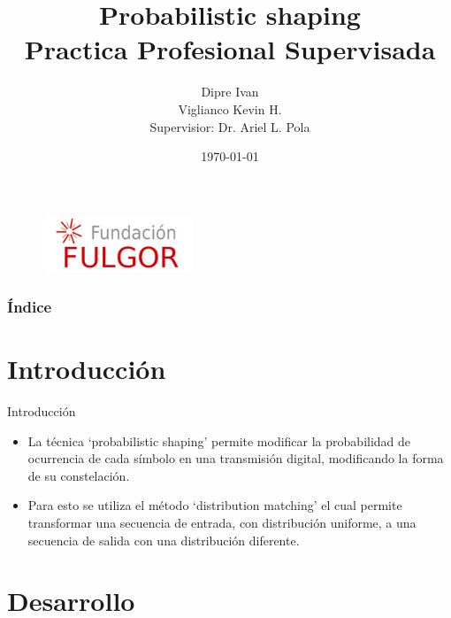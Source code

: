\documentclass[xcolor=table]{beamer}
\title{Probabilistic shaping\\ \small Practica Profesional Supervisada} %
\author{\small Dipre Ivan\\ \small Viglianco Kevin H.\\ \vspace{0.2cm} \small Supervisior: Dr. Ariel L. Pola} %
\date{\today} %
\begin{document}
\begin{frame}
\titlepage %
\begin{figure}[H]
\centering
\includegraphics[width=45mm]{fulgor_logo1.png}
\end{figure}

\end{frame}

\begin{frame}
\frametitle{\'Indice} 
\tableofcontents 
\end{frame}

\section{Introducci\'on}
\begin{frame}{Introducción}
    \begin{itemize}
        \item La técnica `probabilistic shaping' permite modificar la probabilidad de ocurrencia de cada símbolo en una transmisión digital, modificando la forma de su constelación.

        \item Para esto se utiliza el método `distribution matching' el cual permite transformar una secuencia de entrada, con distribución uniforme, a una secuencia de salida con una distribución diferente. 
    \end{itemize}
\end{frame}


\section{Desarrollo}
\end{document}
